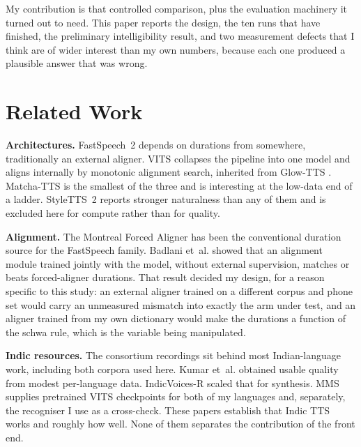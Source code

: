 \documentclass[runningheads]{llncs}
\begin{document}
My contribution is that controlled comparison, plus the evaluation machinery
it turned out to need. This paper reports the design, the ten runs that have
finished, the preliminary intelligibility result, and two measurement defects
that I think are of wider interest than my own numbers, because each one
produced a plausible answer that was wrong.

\section{Related Work}

\textbf{Architectures.} FastSpeech~2 \cite{ren2021fastspeech2} depends on
durations from somewhere, traditionally an external aligner. VITS
\cite{kim2021vits} collapses the pipeline into one model and aligns internally
by monotonic alignment search, inherited from Glow-TTS \cite{kim2020glowtts}.
Matcha-TTS \cite{mehta2024matcha} is the smallest of the three and is
interesting at the low-data end of a ladder. StyleTTS~2
\cite{li2023styletts2} reports stronger naturalness than any of them and is
excluded here for compute rather than for quality.

\textbf{Alignment.} The Montreal Forced Aligner \cite{mcauliffe2017mfa} has
been the conventional duration source for the FastSpeech family. Badlani
et~al. \cite{badlani2022alignment} showed that an alignment module trained
jointly with the model, without external supervision, matches or beats
forced-aligner durations. That result decided my design, for a reason
specific to this study: an external aligner trained on a different corpus and
phone set would carry an unmeasured mismatch into exactly the arm under test,
and an aligner trained from my own dictionary would make the durations a
function of the schwa rule, which is the variable being manipulated.

\textbf{Indic resources.} The consortium recordings \cite{baby2016resources}
sit behind most Indian-language work, including both corpora used here. Kumar
et~al. \cite{kumar2023nextbillion} obtained usable quality from modest
per-language data. IndicVoices-R \cite{sankar2024indicvoicesr} scaled that for
synthesis. MMS \cite{pratap2024mms} supplies pretrained VITS checkpoints for
both of my languages and, separately, the recogniser I use as a cross-check.
These papers establish that Indic TTS works and roughly how well. None of them
separates the contribution of the front end.
\end{document}
